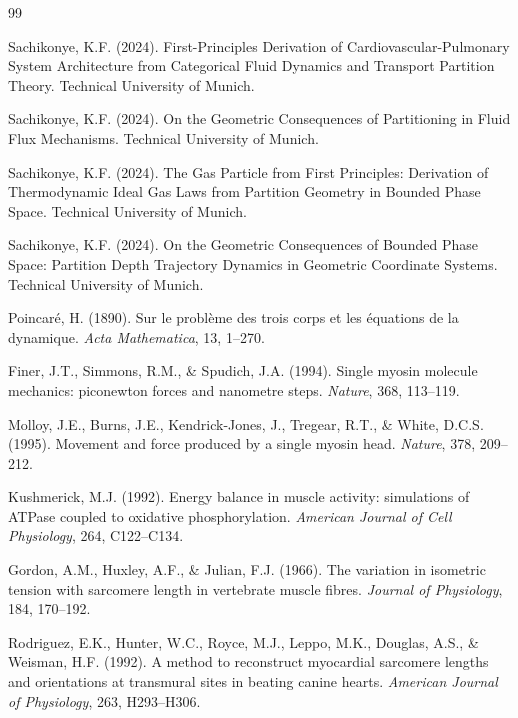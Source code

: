 \documentclass[12pt,a4paper]{article}
\theoremstyle{remark}
\begin{document}
\begin{thebibliography}{99}

Sachikonye, K.F. (2024). First-Principles Derivation of Cardiovascular-Pulmonary System Architecture from Categorical Fluid Dynamics and Transport Partition Theory. Technical University of Munich.

Sachikonye, K.F. (2024). On the Geometric Consequences of Partitioning in Fluid Flux Mechanisms. Technical University of Munich.

Sachikonye, K.F. (2024). The Gas Particle from First Principles: Derivation of Thermodynamic Ideal Gas Laws from Partition Geometry in Bounded Phase Space. Technical University of Munich.

Sachikonye, K.F. (2024). On the Geometric Consequences of Bounded Phase Space: Partition Depth Trajectory Dynamics in Geometric Coordinate Systems. Technical University of Munich.

Poincar\'{e}, H. (1890). Sur le probl\`eme des trois corps et les \'{e}quations de la dynamique. \textit{Acta Mathematica}, 13, 1--270.

Finer, J.T., Simmons, R.M., \& Spudich, J.A. (1994). Single myosin molecule mechanics: piconewton forces and nanometre steps. \textit{Nature}, 368, 113--119.

Molloy, J.E., Burns, J.E., Kendrick-Jones, J., Tregear, R.T., \& White, D.C.S. (1995). Movement and force produced by a single myosin head. \textit{Nature}, 378, 209--212.

Kushmerick, M.J. (1992). Energy balance in muscle activity: simulations of ATPase coupled to oxidative phosphorylation. \textit{American Journal of Cell Physiology}, 264, C122--C134.

Gordon, A.M., Huxley, A.F., \& Julian, F.J. (1966). The variation in isometric tension with sarcomere length in vertebrate muscle fibres. \textit{Journal of Physiology}, 184, 170--192.

Rodriguez, E.K., Hunter, W.C., Royce, M.J., Leppo, M.K., Douglas, A.S., \& Weisman, H.F. (1992). A method to reconstruct myocardial sarcomere lengths and orientations at transmural sites in beating canine hearts. \textit{American Journal of Physiology}, 263, H293--H306.


\end{thebibliography}
\end{document}
